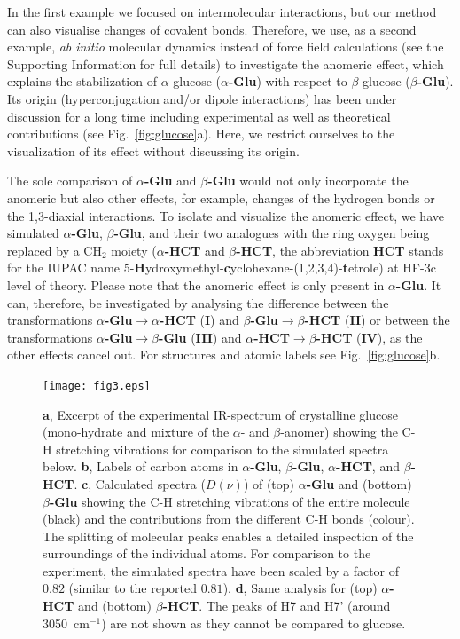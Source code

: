 \documentclass[journal=jpclcd,manuscript=article]{achemso}
\newcommand{\aglu}{\textbf{$\alpha$-Glu}}
\newcommand{\bglu}{\textbf{$\beta$-Glu}}
\newcommand{\ahct}{\textbf{$\alpha$-HCT}}
\newcommand{\bhct}{\textbf{$\beta$-HCT}}
\newcommand{\agluahct}{\textbf{I}}
\newcommand{\bglubhct}{\textbf{II}}
\newcommand{\aglubglu}{\textbf{III}}
\newcommand{\ahctbhct}{\textbf{IV}}
\begin{document}
In the first example we focused on intermolecular interactions, but our method can also visualise changes of covalent bonds. Therefore, we use, as a second example, \emph{ab initio} molecular dynamics instead of force field calculations (see the Supporting Information for full details) to investigate the anomeric effect, which explains the stabilization of $\alpha$-glucose (\aglu{}) with respect to $\beta$-glucose (\bglu{}). Its origin (hyperconjugation and/or dipole interactions) has been under discussion for a long time including experimental\cite{Cocinero2011} as well as theoretical\cite{Mo2010} contributions (see Fig.~\ref{fig:glucose}a). Here, we restrict ourselves to the visualization of its effect without discussing its origin.


The sole comparison of \aglu{} and \bglu{} would not only incorporate the anomeric but also other effects, for example, changes of the hydrogen bonds or the 1,3-diaxial interactions. To isolate and visualize the anomeric effect, we have simulated \aglu{}, \bglu{}, and their two analogues with the ring oxygen being replaced by a CH$_2$ moiety (\ahct{} and \bhct{}, the abbreviation \textbf{HCT} stands for the IUPAC name 5-\textbf{H}ydroxymethyl-\textbf{c}yclohexane-(1,2,3,4)-\textbf{t}etrole) at HF-3c\cite{Sure2013} level of theory. Please note that the anomeric effect is only present in \aglu{}. It can, therefore, be investigated by analysing the difference between the transformations \aglu{}$\rightarrow$\ahct{} (\agluahct) and \bglu{}$\rightarrow$\bhct{} (\bglubhct) or between the transformations \aglu{}$\rightarrow$\bglu{} (\aglubglu) and \ahct{}$\rightarrow$\bhct{} (\ahctbhct), as the other effects cancel out. For structures and atomic labels see Fig.~\ref{fig:glucose}b.

\begin{figure}[h!]
	\centering
	\texttt{[image: fig3.eps]}
	\caption{%
		\textbf{a}, Excerpt of the experimental IR-spectrum of crystalline glucose (mono-hydrate and mixture of the $\alpha$- and $\beta$-anomer) showing the C-H stretching vibrations for comparison to the simulated spectra below.
		\textbf{b}, Labels of carbon atoms in \aglu{}, \bglu{}, \ahct{}, and \bhct{}.
		\textbf{c}, Calculated spectra ($D(\nu)$) of (top) \aglu{} and (bottom) \bglu{} showing the C-H stretching vibrations of the entire molecule (black) and the contributions from the different C-H bonds (colour). The splitting of molecular peaks enables a detailed inspection of the surroundings of the individual atoms. For comparison to the experiment, the simulated spectra have been scaled by a factor of $0.82$ (similar to the reported $0.81$\cite{Peters2017}).
		\textbf{d}, Same analysis for (top) \ahct{} and (bottom) \bhct{}. The peaks of H7 and H7' (around 3050~cm$^{-1}$) are not shown as they cannot be compared to glucose.}
	\label{fig:hydrogen_bonds}
\end{figure}
\end{document}
